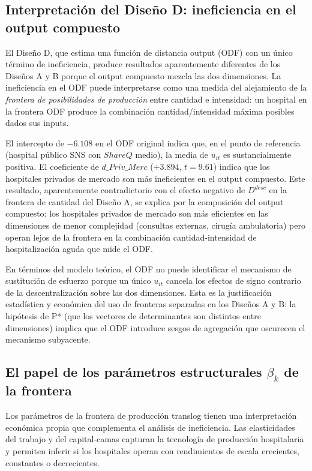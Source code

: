 \subsection{Interpretación del Diseño D: ineficiencia en el output compuesto}

El Diseño D, que estima una función de distancia output (ODF) con un único término de ineficiencia, produce resultados aparentemente diferentes de los Diseños A y B porque el output compuesto mezcla las dos dimensiones. La ineficiencia en el ODF puede interpretarse como una medida del alejamiento de la \textit{frontera de posibilidades de producción} entre cantidad e intensidad: un hospital en la frontera ODF produce la combinación cantidad/intensidad máxima posibles dados sus inputs.

El intercepto de $-6.108$ en el ODF original indica que, en el punto de referencia (hospital público SNS con $ShareQ$ medio), la media de $u_{it}$ es sustancialmente positiva. El coeficiente de $d\_Priv\_Merc$ ($+3.894$, $t=9.61$) indica que los hospitales privados de mercado son más ineficientes en el output compuesto. Este resultado, aparentemente contradictorio con el efecto negativo de $D^{desc}$ en la frontera de cantidad del Diseño A, se explica por la composición del output compuesto: los hospitales privados de mercado son más eficientes en las dimensiones de menor complejidad (consultas externas, cirugía ambulatoria) pero operan lejos de la frontera en la combinación cantidad-intensidad de hospitalización aguda que mide el ODF.

En términos del modelo teórico, el ODF no puede identificar el mecanismo de sustitución de esfuerzo porque un único $u_{it}$ cancela los efectos de signo contrario de la descentralización sobre las dos dimensiones. Esta es la justificación estadística y económica del uso de fronteras separadas en los Diseños A y B: la hipótesis de P* (que los vectores de determinantes son distintos entre dimensiones) implica que el ODF introduce sesgos de agregación que oscurecen el mecanismo subyacente.

\subsection{El papel de los parámetros estructurales \texorpdfstring{$\beta_k$}{beta\_k} de la frontera}

Los parámetros de la frontera de producción translog tienen una interpretación económica propia que complementa el análisis de ineficiencia. Las elasticidades del trabajo y del capital-camas capturan la tecnología de producción hospitalaria y permiten inferir si los hospitales operan con rendimientos de escala crecientes, constantes o decrecientes.


